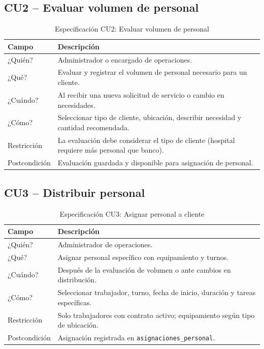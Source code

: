 \documentclass[12pt,a4paper]{report}
\begin{document}
\subsection{CU2 -- Evaluar volumen de personal}

\begin{table}[htbp]
  \centering
  \caption{Especificación CU2: Evaluar volumen de personal}
  \begin{tabular}{@{}p{3.5cm}p{10cm}@{}}
    \toprule
    \textbf{Campo} & \textbf{Descripción} \\
    \midrule
    ¿Quién? & Administrador o encargado de operaciones. \\
    ¿Qué? & Evaluar y registrar el volumen de personal necesario para un cliente. \\
    ¿Cuándo? & Al recibir una nueva solicitud de servicio o cambio en necesidades. \\
    ¿Cómo? & Seleccionar tipo de cliente, ubicación, describir necesidad y cantidad recomendada. \\
    Restricción & La evaluación debe considerar el tipo de cliente (hospital requiere más personal que banco). \\
    Postcondición & Evaluación guardada y disponible para asignación de personal. \\
    \bottomrule
  \end{tabular}
\end{table}

\pagebreak
\subsection{CU3 -- Distribuir personal}

\begin{table}[htbp]
  \centering
  \caption{Especificación CU3: Asignar personal a cliente}
  \begin{tabular}{@{}p{3.5cm}p{10cm}@{}}
    \toprule
    \textbf{Campo} & \textbf{Descripción} \\
    \midrule
    ¿Quién? & Administrador de operaciones. \\
    ¿Qué? & Asignar personal específico con equipamiento y turnos. \\
    ¿Cuándo? & Después de la evaluación de volumen o ante cambios en distribución. \\
    ¿Cómo? & Seleccionar trabajador, turno, fecha de inicio, duración y tareas específicas. \\
    Restricción & Solo trabajadores con contrato activo; equipamiento según tipo de ubicación. \\
    Postcondición & Asignación registrada en \texttt{asignaciones\_personal}. \\
    \bottomrule
  \end{tabular}
\end{table}
\end{document}

